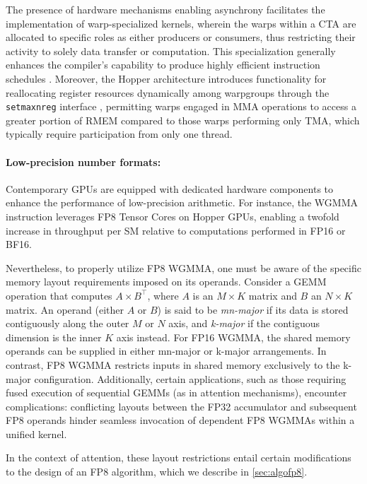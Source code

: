 The presence of hardware mechanisms enabling asynchrony facilitates the implementation of warp-specialized kernels, wherein the warps within a CTA are allocated to specific roles as either producers or consumers, thus restricting their activity to solely data transfer or computation. This specialization generally enhances the compiler's capability to produce highly efficient instruction schedules \citep{warp-specialization-2011}. Moreover, the Hopper architecture introduces functionality for reallocating register resources dynamically among warpgroups through the \verb|setmaxnreg| interface \cite[\S9.7.17.1]{ptx}, permitting warps engaged in MMA operations to access a greater portion of RMEM compared to those warps performing only TMA, which typically require participation from only one thread.

\paragraph{Low-precision number formats:}
\label{sec:low-precision-gpu}
Contemporary GPUs are equipped with dedicated hardware components to enhance the performance of low-precision arithmetic. For instance, the WGMMA instruction leverages FP8 Tensor Cores on Hopper GPUs, enabling a twofold increase in throughput per SM relative to computations performed in FP16 or BF16.

Nevertheless, to properly utilize FP8 WGMMA, one must be aware of the specific memory layout requirements imposed on its operands. Consider a GEMM operation that computes $A \times B^{\top}$, where $A$ is an $M \times K$ matrix and $B$ an $N \times K$ matrix. An operand (either $A$ or $B$) is said to be \emph{mn-major} if its data is stored contiguously along the outer $M$ or $N$ axis, and \emph{k-major} if the contiguous dimension is the inner $K$ axis instead. For FP16 WGMMA, the shared memory operands can be supplied in either mn-major or k-major arrangements. In contrast, FP8 WGMMA restricts inputs in shared memory exclusively to the k-major configuration. Additionally, certain applications, such as those requiring fused execution of sequential GEMMs (as in attention mechanisms), encounter complications: conflicting layouts between the FP32 accumulator and subsequent FP8 operands hinder seamless invocation of dependent FP8 WGMMAs within a unified kernel.

In the context of attention, these layout restrictions entail certain modifications to the design of an FP8 algorithm, which we describe in \cref{sec:algofp8}.

